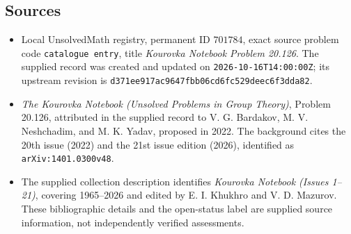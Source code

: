 \documentclass[11pt]{article}
\begin{document}
\subsection{Sources}
\begin{itemize}
\item Local UnsolvedMath registry, permanent ID \(701784\), exact source problem code \texttt{catalogue entry}, title \emph{Kourovka Notebook Problem 20.126}. The supplied record was created and updated on \texttt{2026-10-16T14:00:00Z}; its upstream revision is \texttt{d371ee917ac9647fbb06cd6fc529deec6f3dda82}.
\item \emph{The Kourovka Notebook (Unsolved Problems in Group Theory)}, Problem 20.126, attributed in the supplied record to V. G. Bardakov, M. V. Neshchadim, and M. K. Yadav, proposed in 2022. The background cites the 20th issue (2022) and the 21st issue edition (2026), identified as \texttt{arXiv:1401.0300v48}.
\item The supplied collection description identifies \emph{Kourovka Notebook (Issues 1--21)}, covering 1965--2026 and edited by E. I. Khukhro and V. D. Mazurov. These bibliographic details and the open-status label are supplied source information, not independently verified assessments.
\end{itemize}
\end{document}
